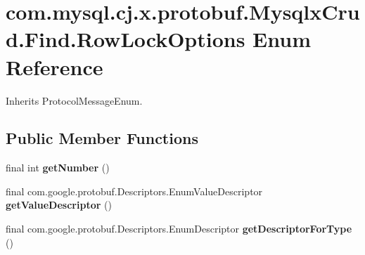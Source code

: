 \hypertarget{enumcom_1_1mysql_1_1cj_1_1x_1_1protobuf_1_1_mysqlx_crud_1_1_find_1_1_row_lock_options}{}\section{com.\+mysql.\+cj.\+x.\+protobuf.\+Mysqlx\+Crud.\+Find.\+Row\+Lock\+Options Enum Reference}
\label{enumcom_1_1mysql_1_1cj_1_1x_1_1protobuf_1_1_mysqlx_crud_1_1_find_1_1_row_lock_options}


Inherits Protocol\+Message\+Enum.

\subsection*{Public Member Functions}
\begin{DoxyCompactItemize}
\item 
\mbox{\label{enumcom_1_1mysql_1_1cj_1_1x_1_1protobuf_1_1_mysqlx_crud_1_1_find_1_1_row_lock_options_a91a232f7f94808831b2e88f984244bc1}} 
final int {\bfseries get\+Number} ()
\item 
\mbox{\label{enumcom_1_1mysql_1_1cj_1_1x_1_1protobuf_1_1_mysqlx_crud_1_1_find_1_1_row_lock_options_a98c457892d7abc0f72f79f082f80dd77}} 
final com.\+google.\+protobuf.\+Descriptors.\+Enum\+Value\+Descriptor {\bfseries get\+Value\+Descriptor} ()
\item 
\mbox{\label{enumcom_1_1mysql_1_1cj_1_1x_1_1protobuf_1_1_mysqlx_crud_1_1_find_1_1_row_lock_options_a840cac2b6342604367d5e563b2003d05}} 
final com.\+google.\+protobuf.\+Descriptors.\+Enum\+Descriptor {\bfseries get\+Descriptor\+For\+Type} ()
\end{DoxyCompactItemize}
